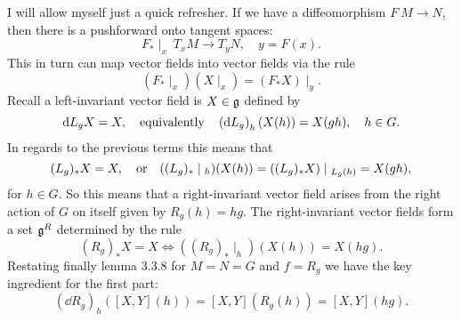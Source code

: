 \documentclass[12pt]{memoir}
\begin{document}
I will allow myself just a quick refresher. If we have a diffeomorphism $F\: M\to N$, then there is a pushforward onto tangent spaces:
$$F_\ast\mid_x\:T_x M\to T_{y}N,\quad y=F(x).$$
This in turn can map vector fields into vector fields via the rule
$$(F_\ast\mid_x)(X\mid_x)=(F_\ast X)\mid_{y}.$$
Recall a left-invariant vector field is $X\in\mathfrak{g}$ defined by 
$$\dd L_gX=X,\quad\text{equivalently}\quad\left(\dd L_g\right)_h (X(h)) = X(gh),\quad h\in G.$$ 
In regards to the previous terms this means that
$$(L_g)_\ast X=X,\word{or}((L_g)_\ast\mid_h)(X(h))=((L_g)_\ast X)\mid_{L_g(h)}=X(gh),$$
for $h\in G$. So this means that a right-invariant vector field arises from the right action of $G$ on itself given by $R_g(h)=hg$. The right-invariant vector fields form a set $\mathfrak{g}^R$ determined by the rule
$$(R_g)_\ast X=X\iff ((R_g)_\ast\mid_h)(X(h))=X(hg).$$
Restating finally lemma 3.3.8 for $M=N=G$ and $f=R_g$ we have the key ingredient for the first part: 
$$(\dd R_g)_h([X,Y](h))=[X,Y](R_g(h))=[X,Y](hg).$$
\end{document}
